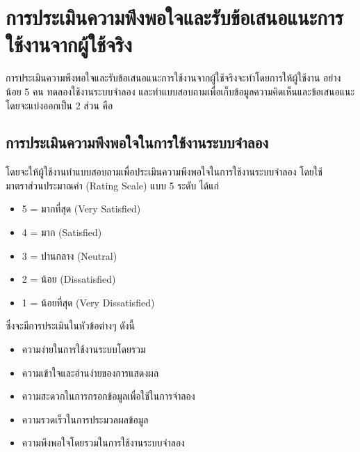 \section{การประเมินความพึงพอใจและรับข้อเสนอแนะการใช้งานจากผู้ใช้จริง}
\begin{mypara}
    \indent การประเมินความพึงพอใจและรับข้อเสนอแนะการใช้งานจากผู้ใช้จริงจะทำโดยการให้ผู้ใช้งาน
    อย่างน้อย 5 คน ทดลองใช้งานระบบจำลอง และทำแบบสอบถามเพื่อเก็บข้อมูลความคิดเห็นและข้อเสนอแนะ
    โดยจะแบ่งออกเป็น 2 ส่วน คือ
    \subsection{การประเมินความพึงพอใจในการใช้งานระบบจำลอง}

        \begin{mypara}
            \indent โดยจะให้ผู้ใช้งานทำแบบสอบถามเพื่อประเมินความพึงพอใจในการใช้งานระบบจำลอง
            โดยใช้มาตราส่วนประมาณค่า (Rating Scale) แบบ 5 ระดับ ได้แก่
            \begin{itemize}
                \item 5 = มากที่สุด (Very Satisfied)
                \item 4 = มาก (Satisfied)
                \item 3 = ปานกลาง (Neutral)
                \item 2 = น้อย (Dissatisfied)
                \item 1 = น้อยที่สุด (Very Dissatisfied)
            \end{itemize}
            ซึ่งจะมีการประเมินในหัวข้อต่างๆ ดังนี้
            \begin{itemize}
                \item ความง่ายในการใช้งานระบบโดยรวม
                \item ความเข้าใจและอ่านง่ายของการแสดงผล
                \item ความสะดวกในการกรอกข้อมูลเพื่อใช้ในการจำลอง
                \item ความรวดเร็วในการประมวลผลข้อมูล
                \item ความพึงพอใจโดยรวมในการใช้งานระบบจำลอง
            \end{itemize}
        \end{mypara}


\end{mypara}
